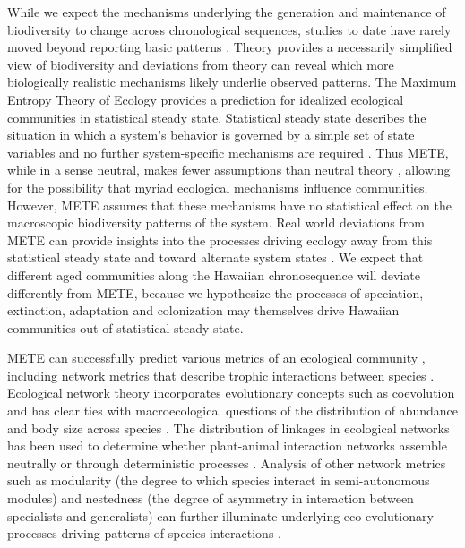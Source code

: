 \documentclass[12pt]{article}
\begin{document}
\begin{linenumbers}
While we expect the mechanisms underlying the generation and
maintenance of biodiversity to change across chronological sequences,
studies to date have rarely moved beyond reporting basic patterns
\citep{gillespieBaldwin}. Theory provides a necessarily simplified
view of biodiversity and deviations from theory can reveal which more
biologically realistic mechanisms likely underlie observed
patterns. The Maximum Entropy Theory of Ecology
\citep[METE;][]{harte2011} provides a prediction for idealized
ecological communities in statistical steady state. Statistical steady
state describes the situation in which a system's behavior is governed
by a simple set of state variables and no further system-specific
mechanisms are required \citep{harte2011, harte2014}. Thus METE, while
in a sense neutral, makes fewer assumptions than neutral theory
\citep{hubbell2001}, allowing for the possibility that myriad
ecological mechanisms influence communities. However, METE assumes
that these mechanisms have no statistical effect on the macroscopic
biodiversity patterns of the system. Real world deviations from METE
can provide insights into the processes driving ecology away from this
statistical steady state and toward alternate system states
\citep{harte2011}. We expect that different aged communities along the
Hawaiian chronosequence will deviate differently from METE, because we
hypothesize the processes of speciation, extinction, adaptation and
colonization may themselves drive Hawaiian communities out of
statistical steady state.

METE can successfully predict various metrics of an ecological
community \citep{harte2011}, including network metrics that describe
trophic interactions between species \citep{williams2010,
  harte2011}. Ecological network theory incorporates evolutionary
concepts such as coevolution \citep{Bascompte2007, Donatti2011,
  Nuismer2013} and has clear ties with macroecological questions of
the distribution of abundance and body size across species
\citep{berlow2009, williams2010, harte2011}. The distribution of
linkages in ecological networks has been used to determine whether
plant-animal interaction networks assemble neutrally or through
deterministic processes \citep{Vazquez2005}. Analysis of other network
metrics such as modularity (the degree to which species interact in
semi-autonomous modules) and nestedness (the degree of asymmetry in
interaction between specialists and generalists) can further
illuminate underlying eco-evolutionary processes driving patterns of
species interactions \citep{Bascompte2007, Donatti2011, Nuismer2013}.


\end{linenumbers}
\end{document}
